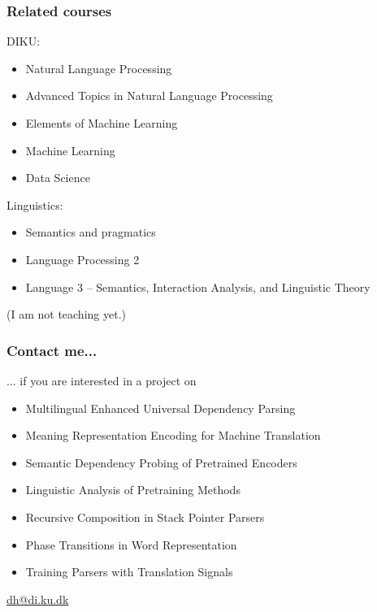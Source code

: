 \documentclass[t,xcolor={svgnames,table}]{beamer}
\begin{document}
\begin{frame}
\frametitle{Related courses}
DIKU:
\begin{itemize}
\item Natural Language Processing
\item Advanced Topics in Natural Language Processing
\item Elements of Machine Learning
\item Machine Learning
\item Data Science
\end{itemize}
Linguistics:
\begin{itemize}
\item Semantics and pragmatics
\item Language Processing 2
\item Language 3 – Semantics, Interaction Analysis, and Linguistic Theory
\end{itemize}

\vfill
(I am not teaching yet.)
\end{frame}

\begin{frame}
\frametitle{Contact me...}
... if you are interested in a project on
\begin{itemize}
\item Multilingual Enhanced Universal Dependency Parsing
\item Meaning Representation Encoding for Machine Translation
\item Semantic Dependency Probing of Pretrained Encoders
\item Linguistic Analysis of Pretraining Methods
\item Recursive Composition in Stack Pointer Parsers
\item Phase Transitions in Word Representation
\item Training Parsers with Translation Signals
\end{itemize}
\vfill
{\Huge\url{dh@di.ku.dk}}
\end{frame}
\end{document}
